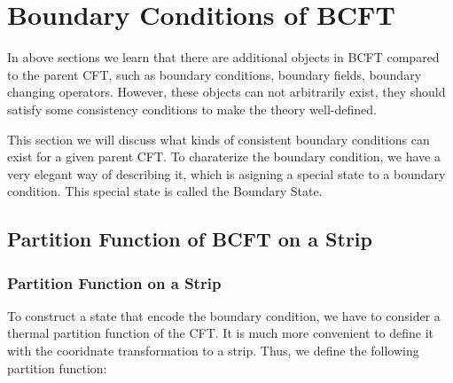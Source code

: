 \newpage

\section{Boundary Conditions of BCFT}\label{sec:Bootstrapping BCFT} %

In above sections we learn that there are additional objects in BCFT
compared to the parent CFT, such as boundary conditions, boundary
fields, boundary changing operators. However, these objects can not
arbitrarily exist, they should satisfy some consistency conditions to
make the theory well-defined.

This section we will discuss what kinds of consistent boundary
conditions can exist for a given parent CFT. To charaterize the
boundary condition, we have a very elegant way of describing it,
which is asigning a special state to a boundary condition. This
special state is called the Boundary State.

\subsection{Partition Function of BCFT on a Strip}

\subsubsection{Partition Function on a Strip}

To construct a state that encode the boundary condition, we have to
consider a thermal partition function of the CFT. It is much more
convenient to define it with the cooridnate transformation to a
strip. Thus, we define the following partition function:

